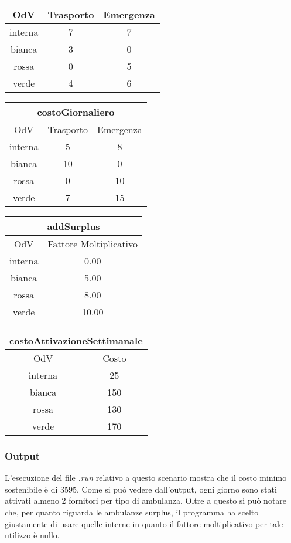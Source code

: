 \begin{center}
\begin{tabular}{|| c || c | c |}
    OdV & Trasporto & Emergenza \\
    \hline
    interna & 7 & 7 \\
    bianca & 3 & 0 \\
    rossa & 0 & 5 \\
    verde & 4 & 6 \\
    \hline    
\end{tabular}
\newline
\begin{tabular}{|| c || c | c |}
    \hline
    \multicolumn{3}{|c|}{costoGiornaliero}\\
    \hline \hline
    OdV & Trasporto & Emergenza \\
    \hline
    interna & 5 & 8 \\
    bianca & 10 & 0 \\
    rossa & 0 & 10 \\
    verde & 7 & 15 \\
    \hline    
\end{tabular}
\begin{tabular}{|| c || c |}
    \hline
    \multicolumn{2}{|c|}{addSurplus} \\ 
    \hline \hline
    OdV & Fattore Moltiplicativo \\
    \hline
    interna & 0.00 \\
    bianca  & 5.00 \\
    rossa   & 8.00 \\
    verde   & 10.00 \\
    \hline
\end{tabular}
\newline
\begin{tabular}{|| c || c |}
    \hline
    \multicolumn{2}{|c|}{costoAttivazioneSettimanale} \\ 
    \hline \hline
    OdV & Costo \\
    \hline
    interna & 25 \\
    bianca  & 150 \\
    rossa   & 130 \\
    verde   & 170 \\
    \hline
\end{tabular}
\end{center}
\subsubsection{Output}
L'esecuzione del file \textit{.run} relativo a questo scenario mostra che il costo minimo sostenibile è di \texteuro $3595$. Come si può vedere dall'output, ogni giorno sono stati attivati almeno 2 fornitori per tipo di ambulanza. Oltre a questo si può notare che, per quanto riguarda le ambulanze surplus, il programma ha scelto giustamente di usare quelle interne in quanto il fattore moltiplicativo per tale utilizzo è nullo.
